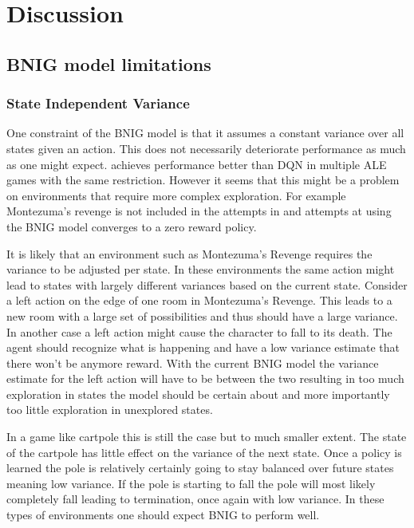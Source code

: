 \chapter{Discussion}\label{ch:disc}

\section{BNIG model limitations}

\subsection{State Independent Variance}

One constraint of the BNIG model is that it assumes a constant variance over all states given an action. This does not necessarily deteriorate performance as much as one might expect. \cite{azziz_2018} achieves performance better than DQN in multiple ALE games with the same restriction. However it seems that this might be a problem on environments that require more complex exploration. For example Montezuma's revenge is not included in the attempts in \cite{azziz_2018} and attempts at using the BNIG model converges to a zero reward policy.

It is likely that an environment such as Montezuma's Revenge requires the variance to be adjusted per state. In these environments the same action might lead to states with largely different variances based on the current state. Consider a left action on the edge of one room in Montezuma's Revenge. This leads to a new room with a large set of possibilities and thus should have a large variance. In another case a left action might cause the character to fall to its death. The agent should recognize what is happening and have a low variance estimate that there won't be anymore reward. With the current BNIG model the variance estimate for the left action will have to be between the two resulting in too much exploration in states the model should be certain about and more importantly too little exploration in unexplored states.

In a game like cartpole this is still the case but to much smaller extent. The state of the cartpole has little effect on the variance of the next state. Once a policy is learned the pole is relatively certainly going to stay balanced over future states meaning low variance. If the pole is starting to fall the pole will most likely completely fall leading to termination, once again with low variance. In these types of environments one should expect BNIG to perform well.


